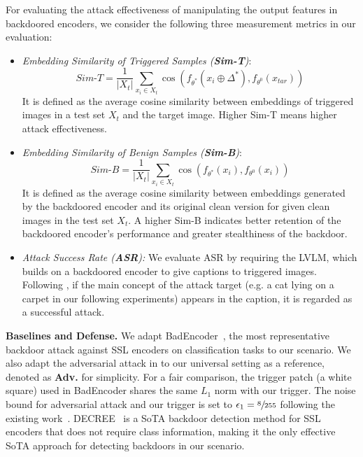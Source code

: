 For evaluating the attack effectiveness of manipulating the output features in backdoored encoders, we consider the following three measurement metrics in our evaluation:
\begin{itemize}
    \item \textit{Embedding Similarity of Triggered Samples (\textbf{Sim-T})}:
    \[Sim\text{-}T = \frac{1}{|X_t|}\sum_{x_i\in X_t} \cos(f_{\theta^*}(x_i \oplus \varDelta^*), f_{\theta^0}(x_{tar}))\]
    It is defined as the average cosine similarity between embeddings of triggered images in a test set $X_t$ and the target image. Higher Sim-T means higher attack effectiveness.
    \item \textit{Embedding Similarity of Benign Samples (\textbf{Sim-B})}:
    \[Sim\text{-}B = \frac{1}{|X_t|}\sum_{x_i\in X_t} \cos(f_{\theta^*}(x_i), f_{\theta^0}(x_{i}))\]
    It is defined as the average cosine similarity between embeddings generated by the backdoored encoder and its original clean version for given clean images in the test set $X_t$. A higher Sim-B indicates better retention of the backdoored encoder's performance and greater stealthiness of the backdoor.
    \item \textit{Attack Success Rate (\textbf{ASR}):} We evaluate ASR by requiring the LVLM, which builds on a backdoored encoder to give captions to triggered images. Following \cite{liang2024vl,liang2024revisiting}, if the main concept of the attack target (e.g. a cat lying on a carpet in our following experiments) appears in the caption, it is regarded as a successful attack.
\end{itemize}

\noindent\textbf{Baselines and Defense.} We adapt BadEncoder~\cite{jia2022badencoder}, the most representative backdoor attack against SSL encoders on classification tasks to our scenario. We also adapt the adversarial attack in \cite{zhao2024evaluating} to our universal setting as a reference, denoted as \textbf{Adv.} for simplicity. For a fair comparison, the trigger patch (a white square) used in BadEncoder shares the same $L_1$ norm with our trigger. The noise bound for adversarial attack and our trigger is set to $\epsilon_1=\sfrac{8}{255}$ following the existing work~\cite{zhao2024evaluating}. DECREE~\cite{feng2023detecting} is a SoTA backdoor detection method for SSL encoders that does not require class information, making it the only effective SoTA approach for detecting backdoors in our scenario.

